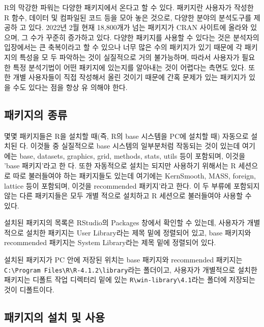 \documentclass[
]{book}
\begin{document}
R의 막강한 파워는 다양한 패키지에서 온다고 할 수 있다. 패키지란 사용자가
작성한 R 함수, 데이터 및 컴파일된 코드 등을 모아 놓은 것으로, 다양한
분야의 분석도구를 제공하 고 있다. 2022년 2월 현재 18,800개가 넘는
패키지가 CRAN 사이트에 올라와 있으며, 그 수가 꾸준히 증가하고 있다.
다양한 패키지를 사용할 수 있다는 것은 분석자의 입장에서는 큰 축복이라고
할 수 있으나 너무 많은 수의 패키지가 있기 때문에 각 패키지의 특성을 모
두 파악하는 것이 실질적으로 거의 불가능하며, 따라서 사용자가 필요한 특정
분석기법이 어떤 패키지에 있는지를 알아내는 것이 어렵다는 측면도 있다.
또한 개별 사용자들이 직접 작성해서 올린 것이기 때문에 간혹 문제가 있는
패키지가 있을 수도 있다는 점을 항상 유 의해야 한다.

\hypertarget{uxd328uxd0a4uxc9c0uxc758-uxc885uxb958}{%
\subsection{패키지의 종류}\label{uxd328uxd0a4uxc9c0uxc758-uxc885uxb958}}

몇몇 패키지들은 R을 설치할 때(즉, R의 base 시스템을 PC에 설치할 때)
자동으로 설치된 다. 이것들 중 실질적으로 base 시스템의 일부분처럼
작동되는 것이 있는데 여기에는 base, datasets, graphics, grid, methods,
stats, utils 등이 포함되며, 이것을 'base 패키지'라고 한 다. 또한
자동적으로 설치는 되지만 사용하기 위해서는 R 세션으로 따로 불러들여야
하는 패키지들도 있는데 여기에는 KernSmooth, MASS, foreign, lattice 등이
포함되며, 이것을 recommended 패키지'라고 한다. 이 두 부류에 포함되지
않는 다른 패키지들은 모두 개별 적으로 설치하고 R 세션으로 불러들여야
사용할 수 있다.

설치된 패키지의 목록은 RStudio의 Packages 창에서 확인할 수 있는데,
사용자가 개별 적으로 설치한 패키지는 User Library라는 제목 밑에 정렬되어
있고, base 패키지와 recommended 패키지는 System Library라는 제목 밑에
정렬되어 있다.

설치된 패키지가 PC 안에 저장된 위치는 base 패키지와 recommended 패키지는
\texttt{C:\textbackslash{}Program\ Files\textbackslash{}R\textbackslash{}R-4.1.2\textbackslash{}library}라는 폴더이고, 사용자가 개별적으로
설치한 패키지는 디폴트 작업 디렉터리 밑에 있는 \texttt{R\textbackslash{}win-library\textbackslash{}4.1}라는
폴더에 저장되는 것이 디폴트이다.

\hypertarget{uxd328uxd0a4uxc9c0uxc758-uxc124uxce58-uxbc0f-uxc0acuxc6a9}{%
\subsection{패키지의 설치 및 사용}\label{uxd328uxd0a4uxc9c0uxc758-uxc124uxce58-uxbc0f-uxc0acuxc6a9}}
\end{document}
